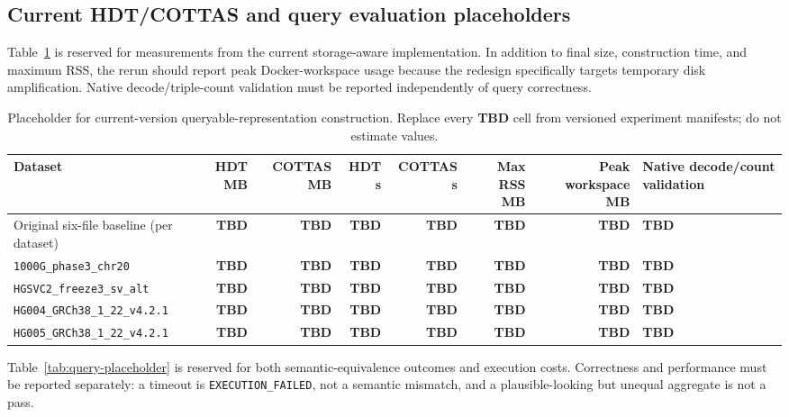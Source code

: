 \documentclass[pdflatex,sn-mathphys-num]{sn-jnl}%
\newenvironment{revision}{\begingroup\color{revisionblue}}{\endgroup}%
\theoremstyle{thmstyleone}%
\theoremstyle{thmstyletwo}%
\theoremstyle{thmstylethree}%
\begin{document}
\begin{revision}
\subsection{Current HDT/COTTAS and query evaluation placeholders}\label{subsec3.1}
Table~\ref{tab:current-compression-placeholder} is reserved for measurements from the current storage-aware implementation. In addition to final size, construction time, and maximum RSS, the rerun should report peak Docker-workspace usage because the redesign specifically targets temporary disk amplification. Native decode/triple-count validation must be reported independently of query correctness.

\begin{table}[t]
\caption{Placeholder for current-version queryable-representation construction. Replace every \textbf{TBD} cell from versioned experiment manifests; do not estimate values.}\label{tab:current-compression-placeholder}%
\centering
\scriptsize
\setlength{\tabcolsep}{3pt}
\begin{tabularx}{\textwidth}{@{}p{}rrrrrrX@{}}
\toprule
\textbf{Dataset} & \textbf{HDT MB} & \textbf{COTTAS MB} & \textbf{HDT s} & \textbf{COTTAS s} & \textbf{Max RSS MB} & \textbf{Peak workspace MB} & \textbf{Native decode/count validation} \\
\midrule
Original six-file baseline (per dataset) & \textbf{TBD} & \textbf{TBD} & \textbf{TBD} & \textbf{TBD} & \textbf{TBD} & \textbf{TBD} & \textbf{TBD} \\
\texttt{1000G\_phase3\_chr20} & \textbf{TBD} & \textbf{TBD} & \textbf{TBD} & \textbf{TBD} & \textbf{TBD} & \textbf{TBD} & \textbf{TBD} \\
\texttt{HGSVC2\_freeze3\_sv\_alt} & \textbf{TBD} & \textbf{TBD} & \textbf{TBD} & \textbf{TBD} & \textbf{TBD} & \textbf{TBD} & \textbf{TBD} \\
\texttt{HG004\_GRCh38\_1\_22\_v4.2.1} & \textbf{TBD} & \textbf{TBD} & \textbf{TBD} & \textbf{TBD} & \textbf{TBD} & \textbf{TBD} & \textbf{TBD} \\
\texttt{HG005\_GRCh38\_1\_22\_v4.2.1} & \textbf{TBD} & \textbf{TBD} & \textbf{TBD} & \textbf{TBD} & \textbf{TBD} & \textbf{TBD} & \textbf{TBD} \\
\bottomrule
\end{tabularx}
\end{table}

Table~\ref{tab:query-placeholder} is reserved for both semantic-equivalence outcomes and execution costs. Correctness and performance must be reported separately: a timeout is \texttt{EXECUTION\_FAILED}, not a semantic mismatch, and a plausible-looking but unequal aggregate is not a pass.


\end{revision}
\end{document}
